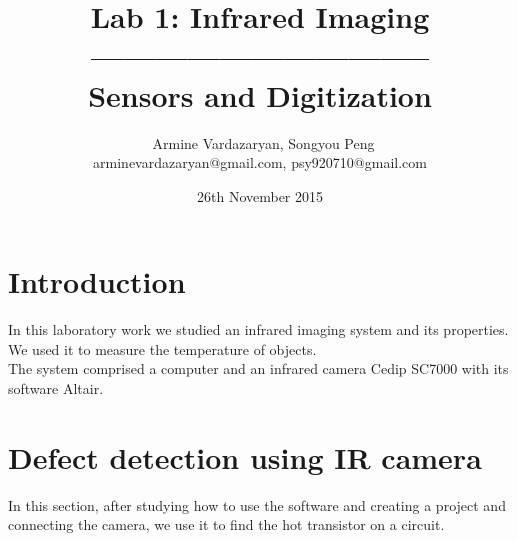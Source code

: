 \documentclass[english]{article}
\begin{document}
\title{Lab 1: Infrared Imaging\\ -------------------------------- \\ \Large Sensors and Digitization}
\author{ \ Armine Vardazaryan, Songyou Peng \\ arminevardazaryan@gmail.com, psy920710@gmail.com}
\date{26th November 2015}

\maketitle

\section{Introduction}
In this laboratory work we studied an infrared imaging system and its properties. 
We used it to measure the temperature of objects. \\
The system comprised a computer and an infrared camera Cedip SC7000 with its software Altair.\\
\section{Defect detection using IR camera}
In this section, after studying how to use the software and creating a project and connecting the camera, we use it to find the hot transistor on a circuit.\\
\end{document}
